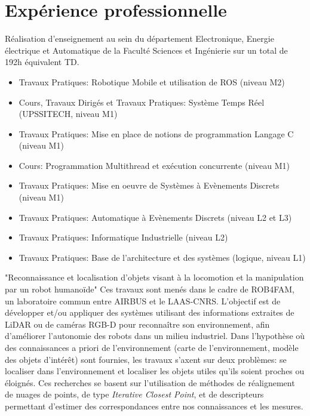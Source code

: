 \documentclass[11pt,a4paper,sans]{moderncv}         %
\begin{document}
\section{Exp\'erience professionnelle}
{
R\'ealisation d'enseignement au sein du d\'epartement Electronique, Energie \'electrique et Automatique de la Facult\'e Sciences et Ing\'enierie sur un total de 192h \'equivalent TD.
\begin{itemize}
  \item Travaux Pratiques: Robotique Mobile et utilisation de ROS (niveau M2)
  \item Cours, Travaux Dirig\'es et Travaux Pratiques: Syst\`eme Temps R\'eel (UPSSITECH, niveau M1)
  \item Travaux Pratiques: Mise en place de notions de programmation Langage C (niveau M1)
  \item Cours: Programmation Multithread et ex\'ecution concurrente (niveau M1)
  \item Travaux Pratiques: Mise en oeuvre de Syst\`emes \`a Ev\`enements Discrets (niveau M1)
  \item Travaux Pratiques: Automatique \`a Ev\`enements Discrets (niveau L2 et L3)
  \item Travaux Pratiques: Informatique Industrielle (niveau L2)
  \item Travaux Pratiques: Base de l'architecture et des syst\`emes (logique, niveau L1)
\end{itemize}
}
{"Reconnaissance et localisation d'objets visant \`a la locomotion et la manipulation par un robot humano\"ide"}
{Ces travaux sont men\'es dans le cadre de ROB4FAM, un laboratoire commun entre AIRBUS et le LAAS-CNRS.
L'objectif est de d\'evelopper et/ou appliquer des syst\`emes utilisant des informations extraites de LiDAR ou de cam\'eras RGB-D pour reconna\^itre son environnement, afin d'am\'eliorer l'autonomie des robots dans un milieu industriel.
Dans l'hypoth\`ese o\`u des connaissances a priori de l'environnement (carte de l'environnement, mod\`ele des objets d'int\'er\^et) sont fournies, les travaux s'axent sur deux probl\`emes: se localiser dans l'environnement et localiser les objets utiles qu'ils soient proches ou \'eloign\'es.
Ces recherches se basent sur l'utilisation de m\'ethodes de r\'ealignement de nuages de points, de type \emph{Iterative Closest Point}, et de descripteurs permettant d'estimer des correspondances entre nos connaissances et les mesures.
}
\end{document}

